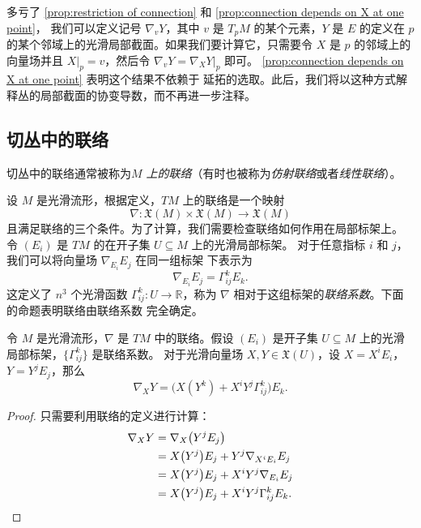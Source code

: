 \documentclass[fontset=none]{Notes}
\begin{document}
多亏了 \autoref{prop:restriction of connection} 和 \autoref{prop:connection depends on X at one point}，
我们可以定义记号 $\nabla_vY$，其中 $v$ 是 $T_pM$ 的某个元素，$Y$ 是 $E$ 的定义在
$p$ 的某个邻域上的光滑局部截面。如果我们要计算它，只需要令 $X$ 是 $p$
的邻域上的向量场并且 $X|_p=v$，然后令 $\nabla_vY=\nabla_XY|_p$ 即可。
\autoref{prop:connection depends on X at one point} 表明这个结果不依赖于
延拓的选取。此后，我们将以这种方式解释丛的局部截面的协变导数，而不再进一步注释。

\subsection{切丛中的联络}

切丛中的联络通常被称为\emph{$M$ 上的联络}（有时也被称为\emph{仿射联络}或者\emph{线性联络}）。

设 $M$ 是光滑流形，根据定义，$TM$ 上的联络是一个映射
\[
  \nabla:\mathfrak{X}(M)\times \mathfrak{X}(M)\to \mathfrak{X}(M)  
\]
且满足联络的三个条件。为了计算，我们需要检查联络如何作用在局部标架上。
令 $(E_i)$ 是 $TM$ 的在开子集 $U\subseteq M$ 上的光滑局部标架。
对于任意指标 $i$ 和 $j$，我们可以将向量场 $\nabla_{E_i}E_j$ 在同一组标架
下表示为
\begin{equation}
  \nabla_{E_i}E_j=\Gamma_{ij}^k E_k.
\end{equation}
这定义了 $n^3$ 个光滑函数 $\Gamma_{ij}^k:U\to \mathbb{R}$，称为
$\nabla$ 相对于这组标架的\emph{联络系数}。下面的命题表明联络由联络系数
完全确定。

\begin{proposition}
  令 $M$ 是光滑流形，$\nabla$ 是 $TM$ 中的联络。假设 $(E_i)$ 是开子集
  $U\subseteq M$ 上的光滑局部标架，$\{\Gamma_{ij}^k\}$ 是联络系数。
  对于光滑向量场 $X,Y\in \mathfrak{X}(U)$，设 $X=X^iE_i$，
  $Y=Y^jE_j$，那么
  \begin{equation}
    \nabla_XY=\bigl(X(Y^k)+X^iY^j\Gamma_{ij}^k\bigr)E_k.
  \end{equation}
\end{proposition}
\begin{proof}
  只需要利用联络的定义进行计算：
  \begin{align*}
    \nabla_XY&=\nabla_X\bigl(Y^jE_j\bigr)\\
    &=X\bigl(Y^j\bigr)E_j+Y^j\nabla_{X^iE_i}E_j\\
    &=X\bigl(Y^j\bigr)E_j+X^iY^j\nabla_{E_i}E_j\\
    &=X\bigl(Y^j\bigr)E_j+X^iY^j\Gamma_{ij}^kE_k.\qedhere
  \end{align*}
\end{proof}
\end{document}

